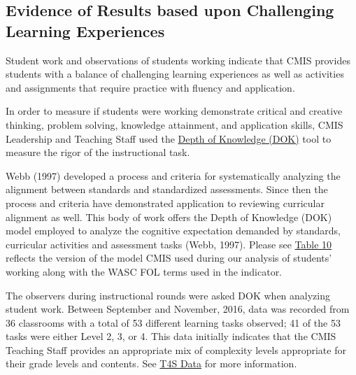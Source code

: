 \subsection{Evidence of Results based upon Challenging Learning Experiences }



\begin{findings}
Student work and observations of students working indicate that CMIS provides students with a balance of challenging learning experiences as well as activities and assignments that require practice with fluency and application.  


In order to measure if students were working demonstrate critical and creative thinking, problem solving, knowledge attainment, and application skills, CMIS Leadership and Teaching Staff used the  \href{https://drive.google.com/a/cmis.ac.th/file/d/0ByVFfrm0zfolNVJmeEJwcHUxbjg/view?usp=sharing}{Depth of Knowledge (DOK)} tool to measure the rigor of the  instructional task. 

Webb (1997) developed a process and criteria for systematically analyzing the alignment between standards and standardized assessments. Since then the process and criteria have demonstrated application to reviewing curricular alignment as well. This body of work offers the Depth of Knowledge (DOK) model employed to analyze the cognitive expectation demanded by standards, curricular activities and assessment tasks (Webb, 1997). Please see \href{https://docs.google.com/a/cmis.ac.th/document/d/1cZlDn-POZCJs2XZ1SLF-CL_DtiO4GscppQ71QZJtFGg/edit?usp=sharing}{Table 10} reflects the version of the model CMIS used during our analysis of  students’ working along with the WASC FOL terms used in the indicator. 

The observers during instructional rounds were asked DOK when analyzing student work. Between September and November, 2016, data was recorded from 36 classrooms with a total of 53 different learning tasks observed; 41 of the 53 tasks were either Level 2, 3, or 4. This data initially indicates that the CMIS Teaching Staff provides an appropriate mix of complexity levels appropriate for their grade levels and contents. See \href{https://docs.google.com/a/cmis.ac.th/document/d/1cRvL50iIDvo8s1Gnxoczm82LhSVmEOvCrFksxzHD7ko/edit?usp=sharing}{T4S Data} for more information. 


\end{findings}
